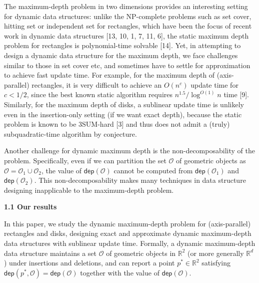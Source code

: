 The maximum-depth problem in two dimensions provides an interesting setting for dynamic data structures: unlike the NP-complete problems such as set cover, hitting set or independent set for rectangles, which have been the focus of recent work in dynamic data structures [13, 10, 1, 7, 11, 6], the static maximum depth problem for rectangles is polynomial-time solvable [14]. Yet, in attempting to design a dynamic data structure for the maximum depth, we face challenges similar to those in set cover etc, and sometimes have to settle for approximation to achieve fast update time. For example, for the maximum depth of (axis-parallel) rectangles, it is very difficult to achieve an $O(n^{c})$ update time for $c<1/2$, since the best known static algorithm requires $n^{1.5}/\log^{O(1)}n$ time [9]. Similarly, for the maximum depth of disks, a sublinear update time is unlikely even in the insertion-only setting (if we want exact depth), because the static problem is known to be 3SUM-hard [3] and thus does not admit a (truly) subquadratic-time algorithm by conjecture.
\par
\par
Another challenge for dynamic maximum depth is the non-decomposability of the problem. Specifically, even if we can partition the set $\mathcal{O}$ of geometric objects as $\mathcal{O}=\mathcal{O}_{1}\cup\mathcal{O}_{2}$, the value of $\mathsf{dep}(\mathcal{O})$ cannot be computed from $\mathsf{dep}(\mathcal{O}_{1})$ and $\mathsf{dep}(\mathcal{O}_{2})$. This non-decomposability makes many techniques in data structure designing inapplicable to the maximum-depth problem.
\par
\par
\par\medskip\noindent\textbf{1.1 Our results}\par
In this paper, we study the dynamic maximum-depth problem for (axis-parallel) rectangles and disks, designing exact and approximate dynamic maximum-depth data structures with sublinear update time. Formally, a dynamic maximum-depth data structure maintains a set $\mathcal{O}$ of geometric objects in $\mathbb{R}^{2}$ (or more generally $\mathbb{R}^{d}$) under insertions and deletions, and can report a point $p^{*}\in\mathbb{R}^{2}$ satisfying $\mathsf{dep}(p^{*},\mathcal{O})=\mathsf{dep}(\mathcal{O})$ together with the value of $\mathsf{dep}(\mathcal{O})$.
\par
\par
